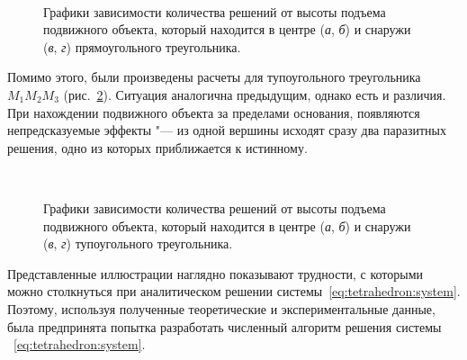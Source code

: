 \documentclass[../main.tex]{subfiles}
\begin{document}
\begin{figure}[htpb]
  \centering
  \qquad
  \\
  \qquad

  \caption{Графики зависимости количества решений от высоты подъема подвижного объекта, который находится в центре (\textit{а}, \textit{б}) и снаружи (\textit{в}, \textit{г}) прямоугольного треугольника.}
  \label{fig:tetrahedron:pic4}
\end{figure}

Помимо этого, были произведены расчеты для тупоугольного треугольника $M_1M_2M_3$ (рис.~\ref{fig:tetrahedron:pic5}). Ситуация аналогична предыдущим, однако есть и различия. При нахождении подвижного объекта за пределами основания, появляются непредсказуемые эффекты "--- из одной вершины исходят сразу два паразитных решения, одно из которых приближается к истинному.

\begin{figure}[htpb]
  \centering
  \qquad
  \\
  \qquad

  \caption{Графики зависимости количества решений от высоты подъема подвижного объекта, который находится в центре (\textit{а}, \textit{б}) и снаружи (\textit{в}, \textit{г}) тупоугольного треугольника.}
  \label{fig:tetrahedron:pic5}
\end{figure}

Представленные иллюстрации наглядно показывают трудности, с которыми можно столкнуться при аналитическом решении системы~\eqref{eq:tetrahedron:system}. Поэтому, используя полученные теоретические и экспериментальные данные, была предпринята попытка разработать численный алгоритм решения системы ~\eqref{eq:tetrahedron:system}.
\end{document}
